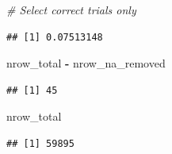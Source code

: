 \documentclass[
]{article}
\newenvironment{Shaded}{\begin{snugshade}}{\end{snugshade}}
\newcommand{\CommentTok}[1]{\textcolor[rgb]{0.56,0.35,0.01}{\textit{#1}}}
\newcommand{\DecValTok}[1]{\textcolor[rgb]{0.00,0.00,0.81}{#1}}
\newcommand{\FunctionTok}[1]{\textcolor[rgb]{0.13,0.29,0.53}{\textbf{#1}}}
\newcommand{\NormalTok}[1]{#1}
\newcommand{\OtherTok}[1]{\textcolor[rgb]{0.56,0.35,0.01}{#1}}
\newcommand{\SpecialCharTok}[1]{\textcolor[rgb]{0.81,0.36,0.00}{\textbf{#1}}}
\begin{document}
\begin{Shaded}
\begin{Highlighting}[]
\CommentTok{\# Select correct trials only}
\end{Highlighting}
\end{Shaded}

\begin{Shaded}
\end{Shaded}

\begin{verbatim}
## [1] 0.07513148
\end{verbatim}

\begin{Shaded}
\begin{Highlighting}[]
\NormalTok{nrow\_total }\SpecialCharTok{{-}}\NormalTok{ nrow\_na\_removed  }
\end{Highlighting}
\end{Shaded}

\begin{verbatim}
## [1] 45
\end{verbatim}

\begin{Shaded}
\begin{Highlighting}[]
\NormalTok{nrow\_total}
\end{Highlighting}
\end{Shaded}

\begin{verbatim}
## [1] 59895
\end{verbatim}
\end{document}
